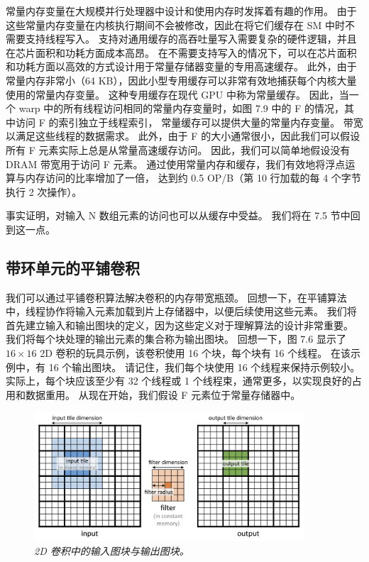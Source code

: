 常量内存变量在大规模并行处理器中设计和使用内存时发挥着有趣的作用。 
由于这些常量内存变量在内核执行期间不会被修改，因此在将它们缓存在 SM 中时不需要支持线程写入。 
支持对通用缓存的高吞吐量写入需要复杂的硬件逻辑，并且在芯片面积和功耗方面成本高昂。 
在不需要支持写入的情况下，可以在芯片面积和功耗方面以高效的方式设计用于常量存储器变量的专用高速缓存。 
此外，由于常量内存非常小（64 KB），因此小型专用缓存可以非常有效地捕获每个内核大量使用的常量内存变量。 
这种专用缓存在现代 GPU 中称为常量缓存。 
因此，当一个 warp 中的所有线程访问相同的常量内存变量时，如图 7.9 中的 F 的情况，其中访问 F 的索引独立于线程索引，
常量缓存可以提供大量的常量内存变量。 带宽以满足这些线程的数据需求。 
此外，由于 F 的大小通常很小，因此我们可以假设所有 F 元素实际上总是从常量高速缓存访问。 
因此，我们可以简单地假设没有 DRAM 带宽用于访问 F 元素。 
通过使用常量内存和缓存，我们有效地将浮点运算与内存访问的比率增加了一倍，
达到约 0.5 OP/B（第 10 行加载的每 4 个字节执行 2 次操作）。

事实证明，对输入 N 数组元素的访问也可以从缓存中受益。 我们将在 7.5 节中回到这一点。

\subsection{带环单元的平铺卷积}
我们可以通过平铺卷积算法解决卷积的内存带宽瓶颈。 
回想一下，在平铺算法中，线程协作将输入元素加载到片上存储器中，以便后续使用这些元素。 
我们将首先建立输入和输出图块的定义，因为这些定义对于理解算法的设计非常重要。 
我们将每个块处理的输出元素的集合称为输出图块。 
回想一下，图 7.6 显示了 $16 \times 16$ 2D 卷积的玩具示例，该卷积使用 16 个块，每个块有 16 个线程。 
在该示例中，有 16 个输出图块。 请记住，我们每个块使用 16 个线程来保持示例较小。 
实际上，每个块应该至少有 32 个线程或 1 个线程束，通常更多，以实现良好的占用和数据重用。 
从现在开始，我们假设 F 元素位于常量存储器中。

\begin{figure}[H]
	\centering
	\includegraphics[width=0.9\textwidth]{figs/F7.11.png}
	\caption{\textit{2D 卷积中的输入图块与输出图块。}}
\end{figure}

